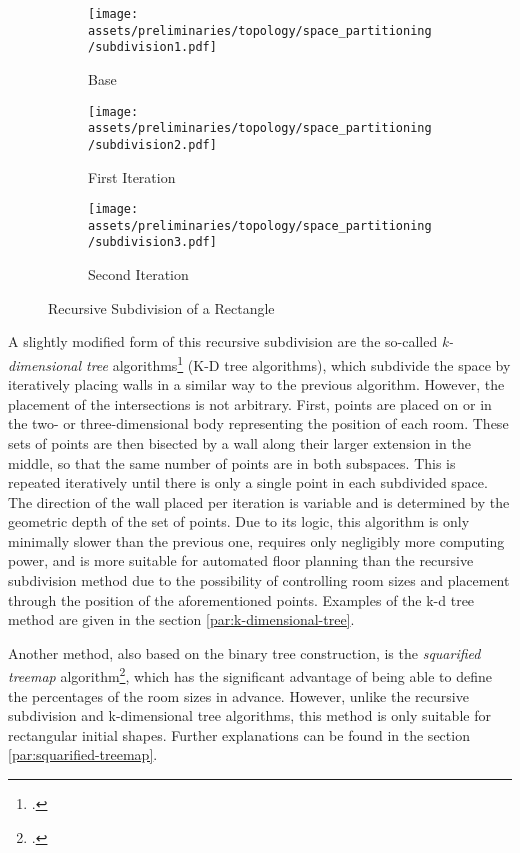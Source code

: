 \documentclass[a4paper, 12pt]{report}
\begin{document}
\begin{figure}
\centering
\begin{subfigure}{.33\textwidth}
\centering
\texttt{[image: assets/preliminaries/topology/space\_partitioning/subdivision1.pdf]}
\caption{Base}
\label{fig:rectangle}
\end{subfigure}%
\begin{subfigure}{.33\textwidth}
\centering
\texttt{[image: assets/preliminaries/topology/space\_partitioning/subdivision2.pdf]}
\caption{First Iteration}
\label{fig:first-iteration}
\end{subfigure}%
\begin{subfigure}{.33\textwidth}
\centering
\texttt{[image: assets/preliminaries/topology/space\_partitioning/subdivision3.pdf]}
\caption{Second Iteration}
\label{fig:second-iteration}
\end{subfigure}
\caption{Recursive Subdivision of a Rectangle}
\label{fig:recursive-subdivision-of-a-rectangle}
\end{figure}

A slightly modified form of this recursive subdivision are the so-called \textit{k-dimensional tree} algorithms\footcite{knecht2010generating} (K-D tree algorithms), which subdivide the space by iteratively placing walls in a similar way to the previous algorithm. However, the placement of the intersections is not arbitrary. First, points are placed on or in the two- or three-dimensional body representing the position of each room. These sets of points are then bisected by a wall along their larger extension in the middle, so that the same number of points are in both subspaces. This is repeated iteratively until there is only a single point in each subdivided space. The direction of the wall placed per iteration is variable and is determined by the geometric depth of the set of points. Due to its logic, this algorithm is only minimally slower than the previous one, requires only negligibly more computing power, and is more suitable for automated floor planning than the recursive subdivision method due to the possibility of controlling room sizes and placement through the position of the aforementioned points. Examples of the k-d tree method are given in the section \ref{par:k-dimensional-tree}.

Another method, also based on the \gls{binary tree} construction, is the \textit{squarified treemap} algorithm\footcite{marson2010automatic}, which has the significant advantage of being able to define the percentages of the room sizes in advance. However, unlike the recursive subdivision and k-dimensional tree algorithms, this method is only suitable for rectangular initial shapes. Further explanations can be found in the section \ref{par:squarified-treemap}. 
\end{document}
